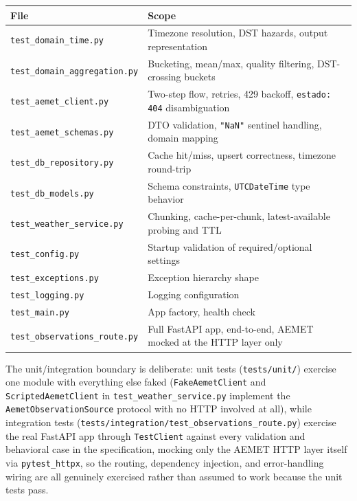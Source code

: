 \documentclass[11pt,a4paper]{article}
\begin{document}
\begin{center}
\begin{tabular}{@{}ll@{}}
\toprule
\textbf{File} & \textbf{Scope} \\
\midrule
\texttt{test\_domain\_time.py} & Timezone resolution, DST hazards, output representation \\
\texttt{test\_domain\_aggregation.py} & Bucketing, mean/max, quality filtering, DST-crossing buckets \\
\texttt{test\_aemet\_client.py} & Two-step flow, retries, 429 backoff, \texttt{estado: 404} disambiguation \\
\texttt{test\_aemet\_schemas.py} & DTO validation, \texttt{"NaN"} sentinel handling, domain mapping \\
\texttt{test\_db\_repository.py} & Cache hit/miss, upsert correctness, timezone round-trip \\
\texttt{test\_db\_models.py} & Schema constraints, \texttt{UTCDateTime} type behavior \\
\texttt{test\_weather\_service.py} & Chunking, cache-per-chunk, latest-available probing and TTL \\
\texttt{test\_config.py} & Startup validation of required/optional settings \\
\texttt{test\_exceptions.py} & Exception hierarchy shape \\
\texttt{test\_logging.py} & Logging configuration \\
\texttt{test\_main.py} & App factory, health check \\
\texttt{test\_observations\_route.py} & Full FastAPI app, end-to-end, AEMET mocked at the HTTP layer only \\
\bottomrule
\end{tabular}
\end{center}

The unit/integration boundary is deliberate: unit tests
(\texttt{tests/unit/}) exercise one module with everything else faked
(\texttt{FakeAemetClient} and \texttt{ScriptedAemetClient} in
\texttt{test\_weather\_service.py} implement the \texttt{AemetObservationSource}
protocol with no HTTP involved at all), while integration tests
(\texttt{tests/integration/test\_observations\_route.py}) exercise the real
FastAPI app through \texttt{TestClient} against every validation and
behavioral case in the specification, mocking only the AEMET HTTP layer
itself via \texttt{pytest\_httpx}, so the routing, dependency injection,
and error-handling wiring are all genuinely exercised rather than assumed
to work because the unit tests pass.
\end{document}
